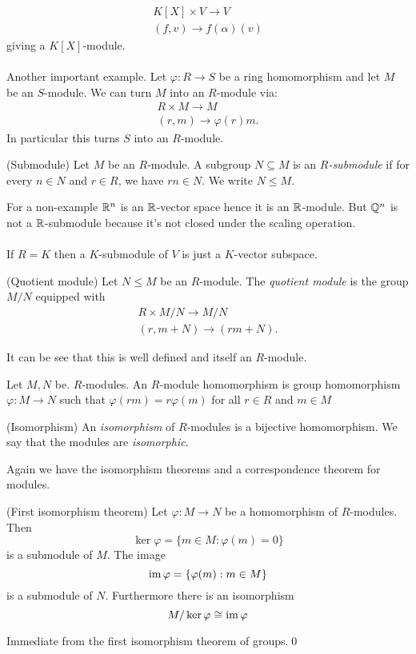 \documentclass{article}
\begin{document}
\begin{itemize}
\begin{align*}
	K[X]\times V\to V \\
	(f,v)\to f(\alpha)(v)
\end{align*}
giving a $ K[X] $-module.\\\\
Another important example. Let $ \varphi:R\to S $ be a ring homomorphism and let $ M $ be an $ S $-module. We can turn $ M $ into an $ R $-module via:
\begin{align*}
  R\times M\to M\\
  (r,m)\to \varphi(r)m.
\end{align*}
In particular this turns $ S $ into an $ R $-module.
\begin{definition}
	(Submodule) Let $ M $ be an $ R $-module. A subgroup $ N\subseteq M $ is an $ R $\textit{-submodule} if for every $ n\in N $ and $ r\in R $, we have $ rn\in N $. We write $ N\le M $.
\end{definition}
For a non-example $ \mathbb{R}^n $ is an $ \mathbb{R} $-vector space hence it is an $ \mathbb{R} $-module. But $ \mathbb{Q}^n $ is not a $ \mathbb{R} $-submodule because it's not closed under the scaling operation.\\\\
If $ R=K $ then a $ K $-submodule of $ V $ is just a $ K $-vector subspace.

\begin{definition}
	(Quotient module) Let $ N\le M $ be an $ R $-module. The \textit{quotient module} is the group $ M/N $ equipped with
	\begin{align*}
	  R\times M/N\to M/N \\
	  (r,m+N)\to (rm+N).
	\end{align*}
\end{definition}
It can be see that this is well defined and itself an $ R $-module.

\begin{definition}
  Let $ M,N $ be. $ R $-modules. An $ R $-module homomorphism is group homomorphism $ \varphi: M\to N $ such that $ \varphi(rm)=r\varphi(m) $ for all $ r\in R $ and $ m \in M$
\end{definition}
\begin{definition}
	(Isomorphism) An \textit{isomorphism} of $ R $-modules is a bijective homomorphism. We say that the modules are \textit{isomorphic}.
\end{definition}
Again we have the isomorphism theorems and a correspondence theorem for modules.
\begin{theorem}
	(First isomorphism theorem) Let $ \varphi: M\to N$ be a homomorphism of $ R $-modules. Then
	\[
		\ker\varphi=\{m\in M:\varphi(m)=0\}
	\]
	is a submodule of $ M $. The image
	\[
		\operatorname{im}\varphi= \{\varphi(m):m\in M\}
	\]
	is a submodule of $ N $. Furthermore there is an isomorphism
	\[
	  M/\ker\varphi\cong\operatorname{im}\varphi
	\]
\end{theorem}
\pf Immediate from the first isomorphism theorem of groups.\qed


\end{itemize}
\end{document}
